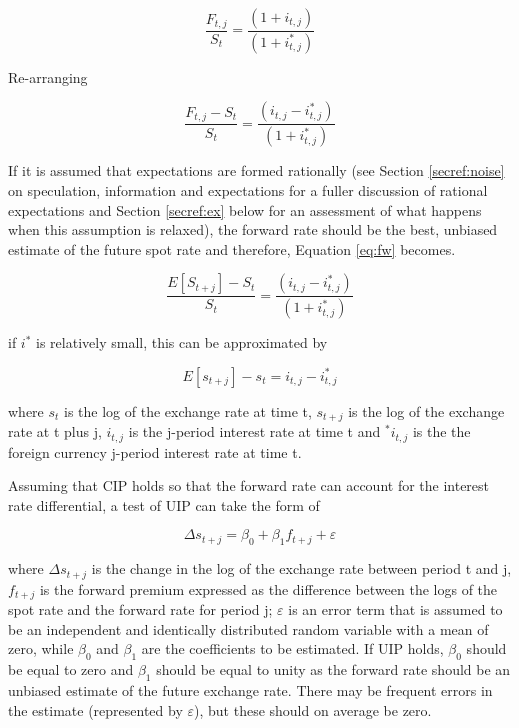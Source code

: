 \documentclass[12pt, a4paper, oneside]{article}\usepackage[]{graphicx}\usepackage[]{color}
\begin{document}
\begin{equation}
\frac{F_{t,j}}{S_t} = \frac{(1 + i_{t, j})}{(1 + i_{t, j}^*)} 
\end{equation}

 Re-arranging

\begin{equation}
\label{eq:fw}
\frac{F_{t,j} - S_t}{S_t} = \frac{(i_{t,j} - i_{t,j}^*)}{(1 + i_{t,j}^*)} 
 \end{equation}

If it is assumed that expectations are formed rationally (see Section \ref{secref:noise} on speculation, information and expectations for a fuller discussion of rational expectations and Section \ref{secref:ex} below for an assessment of what happens when this assumption is relaxed), the forward rate should be the best, unbiased estimate of the future spot rate and therefore, Equation \ref{eq:fw} becomes.  

\begin{equation}
\frac{E[S_{t+j}] - S_t}{S_t} = \frac{(i_{t, j} - i_{t, j}^*)}{(1 + i_{t, j}^*)}
\label{eq:UIP}
\end{equation} 

if $i^*$ is relatively small, this can be approximated by 

\begin{equation}
E[s_{t+j}] - s_t = i_{t,j} - i_{t,j}^* 
\end{equation} 

where $s_t$ is the log of the exchange rate at time t, $s_{t + j}$ is the log of the exchange rate at t plus j, $i_{t, j}$ is the j-period interest rate at time t and $^*i_{t, j}$ is the the foreign currency j-period interest rate at time t.  

Assuming that CIP holds so that the forward rate can account for the interest rate differential, a test of UIP can take the form of 

\begin{equation}
\label{eq:uip}
\Delta s_{t + j} = \beta_0 +\beta_1 f_{t+j} + \varepsilon
\end{equation} 

where $\Delta s_{t + j}$ is the change in the log of the exchange rate between period t and j, $f_{t+j}$ is the forward premium expressed as the difference between the logs of the spot rate and the forward rate for period j; $\varepsilon$ is an error term that is assumed to be an independent and identically distributed random variable with a mean of zero, while $\beta_0$ and $\beta_1$ are the coefficients to be estimated.  If UIP holds, $\beta_0$ should be equal to zero and $\beta_1$ should be equal to unity as the forward rate should be an unbiased estimate of the future exchange rate.   There may be frequent errors in the estimate (represented by $\varepsilon$), but these should on average be zero. 
\end{document}
